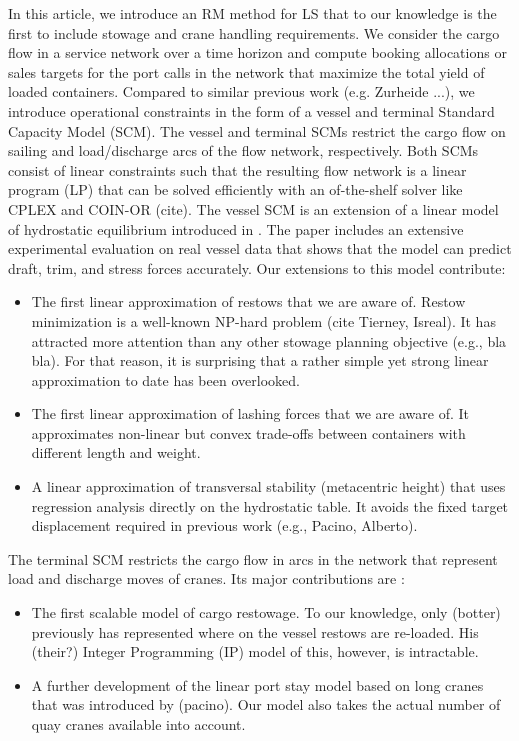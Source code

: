 	In this article, we introduce an RM method for LS that to our knowledge is the first to include stowage and crane handling requirements. We consider the cargo flow in a service network over a time horizon and compute booking allocations or sales targets for the port calls in the network that maximize the total yield of loaded containers. Compared to similar previous work (e.g. Zurheide ...), we introduce operational constraints in the form of a vessel and terminal Standard Capacity Model (SCM). The vessel and terminal SCMs restrict the cargo flow on sailing and load/discharge arcs of the flow network, respectively. Both SCMs consist of linear constraints such that the resulting flow network is a linear program (LP) that can be solved efficiently with an of-the-shelf solver like CPLEX and COIN-OR (cite).
	The vessel SCM is an extension of a linear model of hydrostatic equilibrium introduced in \cite{ICCL18}. The paper includes an extensive experimental evaluation on real vessel data that shows that the model can predict draft, trim, and stress forces accurately. Our extensions to this model contribute:
\begin{itemize}

\item The first linear approximation of restows that we are aware of. Restow minimization is a well-known NP-hard problem (cite Tierney, Isreal). It has attracted more attention than any other stowage planning objective  (e.g., bla bla). For that reason, it is surprising that a rather simple yet strong linear approximation to date has been overlooked. 

\item The first linear approximation of lashing forces that we are aware of. It approximates non-linear but convex trade-offs between containers with different length and weight. 
  
\item A linear approximation of transversal stability (metacentric height) that uses regression analysis directly on the hydrostatic table. It avoids the fixed target displacement required in previous work (e.g., Pacino, Alberto).
  
\end{itemize}

The terminal SCM restricts the cargo flow in arcs in the network that represent load and discharge moves of cranes. Its major contributions are : 
\begin{itemize}

\item The first scalable model of cargo restowage. To our knowledge, only (botter) previously has represented where on the vessel restows are re-loaded. His (their?) Integer Programming (IP) model of this, however, is intractable.

\item A further development of the linear port stay model based on long cranes that was introduced by (pacino). Our model also takes the actual number of quay cranes available into account.    

\end{itemize}

